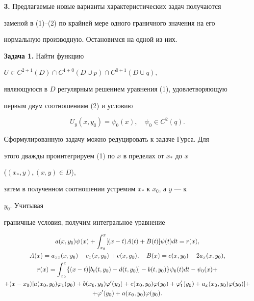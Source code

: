 {\bf 3.} Предлагаемые новые варианты характеристических задач получаются  


заменой в (1)--(2) по крайней мере одного граничного значения на его  


нормальную производную. Остановимся на одной из них. 


\medskip 


 


{\bf Задача 1.} Найти функцию 


$U\in C^{2+1}(D)\cap C^{1+0}(D\cup p)\cap C^{0+1}(D\cup q)$, 


являющуюся в $D$ регулярным решением уравнения (1), удовлетворяющую 


первым двум соотношениям (2) и условию 


$$ 


U_y(x,y_0)=\psi_0(x),\quad \psi_0\in C^2(q). 


$$ 


 


Сформулированную задачу можно редуцировать к задаче Гурса. Для 


этого дважды проинтегрируем (1) по $x$ в пределах от $x_*$ до $x$ 


($(x_*,y),(x,y)\in D$), 


затем в полученном соотношении устремим $x_*$ к $x_0$, а $y$ --- к 


$y_0$. Учитывая  


граничные условия, получим интегральное уравнение 


\begin{gather} 


a(x,y_0)\psi(x)+\int^x_{x_0}[(x-t)A(t)+B(t)]\psi(t)dt=r(x),\\ 


% 


A(x)=a_{xx}(x,y_0)-c_x(x,y_0)+e(x,y_0),\quad 


B(x)=c(x,y_0)-2a_x(x,y_0),\notag \\ 


% 


r(x)=\int^x_{x_0}\{(x-t)[b_t(t,y_0)-d(t,y_0)]- 


b(t,y_0)\}\psi_0(t)dt-\psi_0(x)+\notag \\ 


+(x-x_0)[a(x_0,y_0)\varphi_1(y_0)+b(x_0,y_0)\varphi'(y_0)+ 


c(x_0,y_0)\varphi(y_0)+\varphi'_1(y_0)+ 


a_x(x_0,y_0)\varphi(y_0)]+\notag \\ 


% 


+\varphi'(y_0)+a(x_0,y_0)\varphi(y_0).\notag 


\end{gather} 


